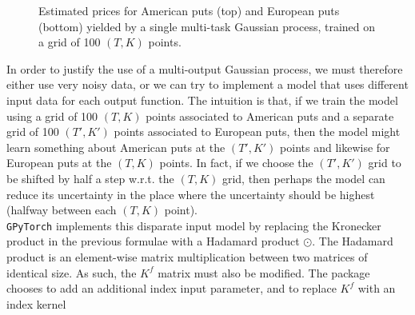 \documentclass[a4paper,12pt]{article}
\begin{document}
\begin{figure}[H]
\begin{minipage}[c]{.9\linewidth}
    \centering
\end{minipage} \vfill
\begin{minipage}[c]{.9\linewidth}
    \centering
\end{minipage}
\caption{Estimated prices for American puts (top) and European puts (bottom) yielded by a single multi-task Gaussian process, trained on a grid of 100 $(T, K)$ points.}
\label{fig:mogp_same_inputs}
\end{figure}
\noindent In order to justify the use of a multi-output Gaussian process, we must therefore either use very noisy data, or we can try to implement a model that uses different input data for each output function. The intuition is that, if we train the model using a grid of 100 $(T, K)$ points associated to American puts and a separate grid of 100 $(T', K')$ points associated to European puts, then the model might learn something about American puts at the $(T', K')$ points and likewise for European puts at the $(T, K)$ points. In fact, if we choose the $(T', K')$ grid to be shifted by half a step w.r.t. the $(T, K)$ grid, then perhaps the model can reduce its uncertainty in the place where the uncertainty should be highest (halfway between each $(T, K)$ point).\\
\texttt{GPyTorch} implements this disparate input model by replacing the Kronecker product in the previous formulae with a Hadamard product $\odot$. The Hadamard product is an element-wise matrix multiplication between two matrices of identical size. As such, the $K^f$ matrix must also be modified. The package chooses to add an additional index input parameter, and to replace $K^f$ with an index kernel 
\end{document}
